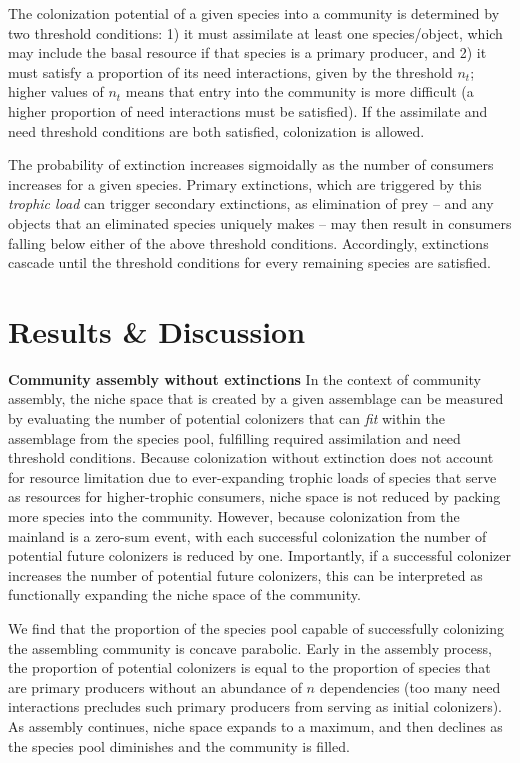 \documentclass[twocolumn,preprintnumbers,amsmath,amssymb,superscriptaddress]{revtex4}
\begin{document}
The colonization potential of a given species into a community is determined by two threshold conditions:
1) it must assimilate at least one species/object, which may include the basal resource if that species is a primary producer, and
2) it must satisfy a proportion of its need interactions, given by the threshold $n_t$; higher values of $n_t$ means that entry into the community is more difficult (a higher proportion of need interactions must be satisfied).
If the assimilate and need threshold conditions are both satisfied, colonization is allowed.




The probability of extinction increases sigmoidally as the number of consumers increases for a given species.
Primary extinctions, which are triggered by this \emph{trophic load} can trigger secondary extinctions, as elimination of prey -- and any objects that an eliminated species uniquely makes -- may then result in consumers falling below either of the above threshold conditions.
Accordingly, extinctions cascade until the threshold conditions for every remaining species are satisfied.


\section*{Results \& Discussion}




{\bf Community assembly without extinctions}
In the context of community assembly, the niche space that is created by a given assemblage can be measured by evaluating the number of potential colonizers that can \emph{fit} within the assemblage from the species pool, fulfilling required assimilation and need threshold conditions.
Because colonization without extinction does not account for resource limitation due to ever-expanding trophic loads of species that serve as resources for higher-trophic consumers, niche space is not reduced by packing more species into the community.
However, because colonization from the mainland is a zero-sum event, with each successful colonization the number of potential future colonizers is reduced by one.
Importantly, if a successful colonizer increases the number of potential future colonizers, this can be interpreted as functionally expanding the niche space of the community.




We find that the proportion of the species pool capable of successfully colonizing the assembling community is concave parabolic.
Early in the assembly process, the proportion of potential colonizers is equal to the proportion of species that are primary producers without an abundance of $n$ dependencies (too many need interactions precludes such primary producers from serving as initial colonizers).
As assembly continues, niche space expands to a maximum, and then declines as the species pool diminishes and the community is filled.
\end{document}
